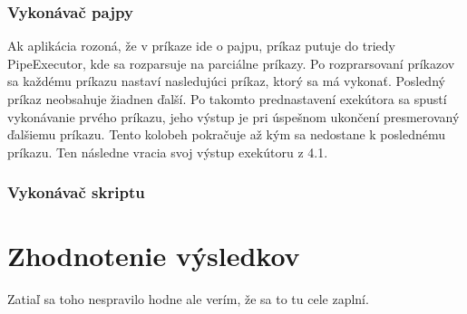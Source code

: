 \subsubsection{Vykonávač pajpy}
\indent Ak aplikácia rozoná, že v príkaze ide o pajpu, príkaz putuje do triedy PipeExecutor, kde sa rozparsuje na parciálne príkazy. Po rozprarsovaní príkazov sa každému príkazu nastaví nasledujúci príkaz, ktorý sa má vykonať. Posledný príkaz neobsahuje žiadnen ďalší. Po takomto prednastavení exekútora sa spustí vykonávanie prvého príkazu, jeho výstup je pri úspešnom ukončení presmerovaný ďalšiemu príkazu. Tento kolobeh pokračuje až kým sa nedostane k poslednému príkazu. Ten následne vracia svoj výstup exekútoru z 4.1.
\subsubsection{Vykonávač skriptu}
\section{Zhodnotenie výsledkov}
Zatiaľ sa toho nespravilo hodne ale verím, že sa to tu cele zaplní.